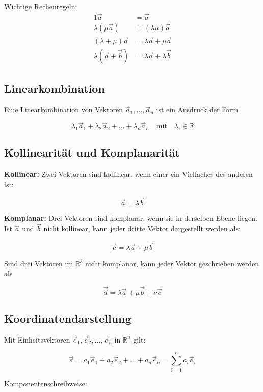 Wichtige Rechenregeln:
\begin{align*}
     1\vec a                  & = \vec a                        \\
     \lambda(\mu \vec a)      & = (\lambda\mu)\vec a            \\
     (\lambda + \mu)\vec a    & = \lambda\vec a + \mu\vec a     \\
     \lambda(\vec a + \vec b) & = \lambda\vec a + \lambda\vec b
\end{align*}

\subsection{Linearkombination}
Eine Linearkombination von Vektoren $\vec a_1,\dots,\vec a_n$ ist ein Ausdruck der Form

\[
     \lambda_1 \vec a_1 + \lambda_2 \vec a_2 + \dots + \lambda_n \vec a_n \quad \text{mit} \quad \lambda_i \in \mathbb{R}
\]



\subsection{Kollinearität und Komplanarität}

\textbf{Kollinear:}
Zwei Vektoren sind kollinear, wenn einer ein Vielfaches des anderen ist:

\[
     \vec a = \lambda \vec b
\]

\textbf{Komplanar:}
Drei Vektoren sind komplanar, wenn sie in derselben Ebene liegen.
Ist $\vec a$ und $\vec b$ nicht kollinear, kann jeder dritte Vektor dargestellt werden als:

\[
     \vec c = \lambda \vec a + \mu \vec b
\]

Sind drei Vektoren im $\mathbb{R}^3$ nicht komplanar, kann jeder Vektor geschrieben werden als

\[
     \vec d = \lambda \vec a + \mu \vec b + \nu \vec c
\]

\subsection{Koordinatendarstellung}

Mit Einheitsvektoren $\vec e_1, \vec e_2, \dots, \vec e_n$ in $\mathbb{R}^n$ gilt:

\[
     \vec a = a_1 \vec e_1 + a_2 \vec e_2 + \dots + a_n \vec e_n = \sum_{i=1}^{n} a_i \vec e_i
\]

Komponentenschreibweise:

